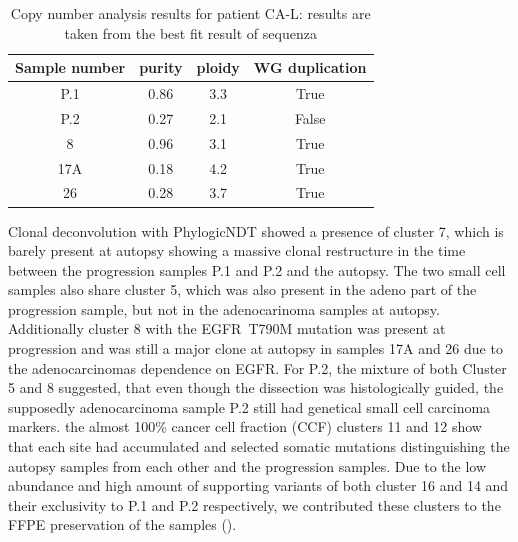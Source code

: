 \begin{table}[ht]
\caption[Copy number analysis results for patient CA-L]{Copy number analysis results for patient CA-L: results are taken from the best fit result of sequenza}\label{tab:ca86cnv}
\centering
{}
\begin{tabular}{|c|c|c|c|}
\toprule
\hline
 \rowcolor{gray!50}
\textbf{Sample number} & \textbf{purity} & \textbf{ploidy} & \textbf{WG duplication}\\
\hline
 P.1 & \num{0.86} &	 \num{3.3}  & True	\\
 P.2 & \num{0.27} & \num{2.1}  & False \\
 8 & \num{0.96} & \num{3.1}  & True \\
 17A & \num{0.18} & \num{4.2}  & True \\
 26 & \num{0.28} & \num{3.7} & True \\
 \hline
\bottomrule
\end{tabular}
\end{table} 

Clonal deconvolution with PhylogicNDT showed a presence of cluster 7, which is barely present at autopsy showing a massive clonal restructure in the time between the progression samples P.1 and P.2 and the autopsy. The two small cell samples also share cluster 5, which was also present in the adeno part of the progression sample, but not in the adenocarinoma samples at autopsy. Additionally cluster 8 with the EGFR~T790M mutation was present at progression and was still a major clone at autopsy in samples 17A and 26 due to the adenocarcinomas dependence on EGFR. For P.2, the mixture of both Cluster 5 and 8 suggested, that even though the dissection was histologically guided, the supposedly adenocarcinoma sample P.2 still had genetical small cell carcinoma markers. the almost 100\% cancer cell fraction (CCF) clusters 11 and 12 show that each site had accumulated and selected somatic mutations distinguishing the autopsy samples from each other and the progression samples. Due to the low abundance and high amount of supporting variants of both cluster 16 and 14 and their exclusivity to P.1 and P.2 respectively, we contributed these clusters to the FFPE preservation of the samples (). 

